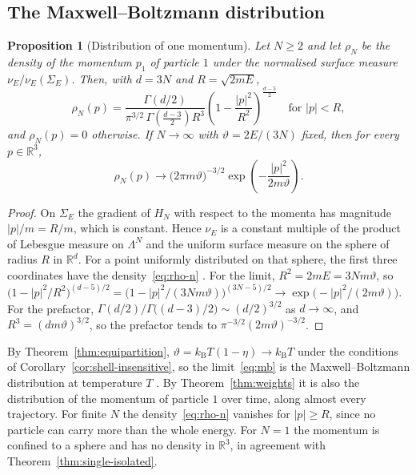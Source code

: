 \documentclass[11pt,a4paper]{article}
\newtheorem{proposition}[theorem]{Proposition}
\theoremstyle{definition}
\theoremstyle{remark}
\newcommand{\R}{\mathbb{R}}
\newcommand{\kB}{k_{\mathrm{B}}}
\begin{document}
\subsection{The Maxwell--Boltzmann distribution}

\begin{proposition}[Distribution of one momentum]
\label{prop:mb}
Let $N\ge2$ and let $\rho_N$ be the density of the momentum $p_1$ of particle $1$ under the normalised surface measure $\nu_{E}/\nu_{E}(\Sigma_{E})$.
Then, with $d=3N$ and $R=\sqrt{2mE}$,
\begin{equation}
\rho_N(p)=\frac{\Gamma(d/2)}{\pi^{3/2}\,\Gamma\!\left(\frac{d-3}{2}\right)R^{3}}\left(1-\frac{|p|^{2}}{R^{2}}\right)^{\frac{d-5}{2}}\quad\text{for }|p|<R,
\label{eq:rho-n}
\end{equation}
and $\rho_N(p)=0$ otherwise.
If $N\to\infty$ with $\vartheta=2E/(3N)$ fixed, then for every $p\in\R^{3}$,
\begin{equation}
\rho_N(p)\to\bigl(2\pi m\vartheta\bigr)^{-3/2}\exp\!\left(-\frac{|p|^{2}}{2m\vartheta}\right).
\label{eq:mb}
\end{equation}
\end{proposition}

\begin{proof}
On $\Sigma_E$ the gradient of $H_N$ with respect to the momenta has magnitude $|p|/m=R/m$, which is constant.
Hence $\nu_E$ is a constant multiple of the product of Lebesgue measure on $\Lambda^{N}$ and the uniform surface measure on the sphere of radius $R$ in $\R^{d}$.
For a point uniformly distributed on that sphere, the first three coordinates have the density~\eqref{eq:rho-n} \citep{diaconis1987}.
For the limit, $R^{2}=2mE=3Nm\vartheta$, so $\bigl(1-|p|^{2}/R^{2}\bigr)^{(d-5)/2}=\bigl(1-|p|^{2}/(3Nm\vartheta)\bigr)^{(3N-5)/2}\to\exp\bigl(-|p|^{2}/(2m\vartheta)\bigr)$.
For the prefactor, $\Gamma(d/2)/\Gamma\bigl((d-3)/2\bigr)\sim(d/2)^{3/2}$ as $d\to\infty$, and $R^{3}=(dm\vartheta)^{3/2}$, so the prefactor tends to $\pi^{-3/2}(2m\vartheta)^{-3/2}$.
\end{proof}

By Theorem~\ref{thm:equipartition}, $\vartheta=\kB T(1-\eta)\to\kB T$ under the conditions of Corollary~\ref{cor:shell-insensitive}, so the limit~\eqref{eq:mb} is the Maxwell--Boltzmann distribution at temperature $T$ \citep{maxwell1860}.
By Theorem~\ref{thm:weights} it is also the distribution of the momentum of particle $1$ over time, along almost every trajectory.
For finite $N$ the density~\eqref{eq:rho-n} vanishes for $|p|\ge R$, since no particle can carry more than the whole energy.
For $N=1$ the momentum is confined to a sphere and has no density in $\R^{3}$, in agreement with Theorem~\ref{thm:single-isolated}.
\end{document}
